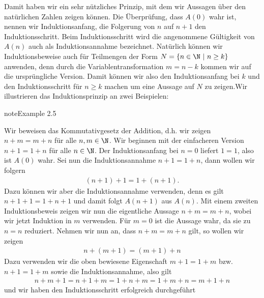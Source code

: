 \documentclass[letterpaper,10pt,english]{jupyterBook}
\begin{document}
Damit haben wir ein sehr nützliches Prinzip, mit dem wir Aussagen über den natürlichen Zahlen zeigen können. Die Überprüfung, dass \(A(0)\) wahr ist, nennen wir Induktionsanfang, die Folgerung von \(n\) auf \(n+1\) den Induktionsschritt. Beim Induktionsschritt wird die angenommene Gültigkeit von \(A(n)\) auch als Induktionsannahme bezeichnet. Natürlich können wir Induktionsbeweise auch für Teilmengen der Form \(N= \{n \in \N~|~n \geq k \}\)
anwenden, denn durch die Variablentransformation \(m=n-k\) kommen wir auf die ursprüngliche Version. Damit können wir also den Induktionsanfang bei \(k\) und den Induktionsschritt für \(n \geq k\) machen um eine Aussage auf \(N\) zu zeigen.Wir illustrieren das Induktionsprinzip an zwei Beispielen:
\label{grundlagen/zahlensysteme:example-2}
\begin{sphinxadmonition}{note}{Example 2.5}



Wir beweisen das Kommutativgesetz der Addition, d.h. wir zeigen \(n+m=m+n\) für alle \(n,m \in \N\). Wir beginnen mit der einfacheren Version \(n+1=1+n\) für alle \(n\in\N\). Der Induktionsanfang bei \(n=0\) liefert \(1=1\), also ist \(A(0)\) wahr. Sei nun die Induktionsannahme \(n+1=1+n\), dann wollen wir folgern
\begin{equation*}
\begin{split} (n+1)+1=1+(n+1).\end{split}
\end{equation*}
Dazu können wir aber die Induktionsannahme verwenden, denn es gilt \(n+1+1 = 1+n+1\) und damit folgt \(A(n+1)\) aus \(A(n)\).
Mit einem zweiten Induktionsbeweis zeigen wir nun die eigentliche Aussage \(n+m=m+n\), wobei wir jetzt Induktion in \(m\) verwenden. Für \(m=0\) ist die Aussage wahr, da sie zu \(n=n\) reduziert. Nehmen wir nun an, dass \(n+m=m+n\) gilt, so wollen wir zeigen
\begin{equation*}
\begin{split} n+(m+1) = (m+1) + n\end{split}
\end{equation*}
Dazu verwenden wir die oben bewiesene Eigenschaft \(m+1 =1+m\) bzw. \(n+1=1+m\) sowie die Induktionsannahme, also gilt
\begin{equation*}
\begin{split} n+m+1=n+1+m=1+n+m=1+m+n=m+1+n\end{split}
\end{equation*}
und wir haben den Induktionsschritt erfolgreich durchgeführt
\end{sphinxadmonition}
\end{document}
